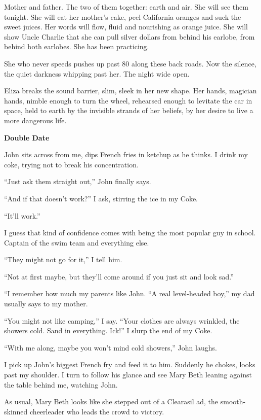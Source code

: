 \documentclass[
]{article}
\begin{document}
Mother and father. The two of them together: earth and air. She will see
them tonight. She will eat her mother's cake, peel California oranges
and suck the sweet juices. Her words will flow, fluid and nourishing as
orange juice. She will show Uncle Charlie that she can pull silver
dollars from behind his earlobe, from behind both earlobes. She has been
practicing.

She who never speeds pushes up past 80 along these back roads. Now the
silence, the quiet darkness whipping past her. The night wide open.

Eliza breaks the sound barrier, slim, sleek in her new shape. Her hands,
magician hands, nimble enough to turn the wheel, rehearsed enough to
levitate the car in space, held to earth by the invisible strands of her
beliefs, by her desire to live a more dangerous life.

\textbf{\hfill\break
}

\textbf{Double Date}

John sits across from me, dips French fries in ketchup as he thinks. I
drink my coke, trying not to break his concentration.

``Just ask them straight out,'' John finally says.

``And if that doesn't work?'' I ask, stirring the ice in my Coke.

``It'll work.''

I guess that kind of confidence comes with being the most popular guy in
school. Captain of the swim team and everything else.

``They might not go for it,'' I tell him.

``Not at first maybe, but they'll come around if you just sit and look
sad.''

``I remember how much my parents like John. ``A real level-headed boy,''
my dad usually says to my mother.

``You might not like camping,'' I say. ``Your clothes are always
wrinkled, the showers cold. Sand in everything. Ick!'' I slurp the end
of my Coke.

``With me along, maybe you won't mind cold showers,'' John laughs.

I pick up John's biggest French fry and feed it to him. Suddenly he
chokes, looks past my shoulder. I turn to follow his glance and see Mary
Beth leaning against the table behind me, watching John.

As usual, Mary Beth looks like she stepped out of a Clearasil ad, the
smooth-skinned cheer­leader who leads the crowd to victory.
\end{document}
